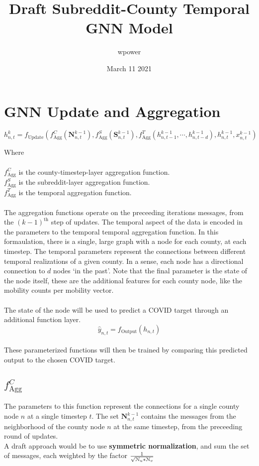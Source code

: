\documentclass{article}
\title{Draft Subreddit-County Temporal GNN Model}
\author{wpower}
\date{March 11 2021}
\begin{document}
\maketitle

\section{GNN Update and Aggregation}


\begin{equation}
h_{n,t}^k= f_{\text{Update}}(
						f_{\text{Agg}}^C(\textbf{N}_{n,t}^{k-1}),
						f_{\text{Agg}}^S(\textbf{S}_{n,t}^{k-1}),
						f_{\text{Agg}}^T(h_{n,t-1}^{k-1}, \cdots, h_{n, t-d}^{k-1}), 
						h_{n, t}^{k-1}, x_{n, t}^{k-1})
\end{equation}

Where \\
\\
$f_{\text{Agg}}^C$ is the county-timestep-layer aggregation function. \\
$f_{\text{Agg}}^S$ is the subreddit-layer aggregation function. \\
$f_{\text{Agg}}^T$ is the temporal aggregation function.  \\
\\
The aggregation functions operate on the preceeding iterations messages, from the $(k-1)^\text{th}$ step of updates. The temporal aspect of the data is encoded in the parameters to the temporal temporal aggregation function. In this formaulation, there is a single, large graph with a node for each county, at each timestep. The temporal parameters represent the connections between different temporal realizations of a given county. In a sense, each node has a directional connection to $d$ nodes `in the past'. Note that the final parameter is the state of the node itself, these are the additional features for each county node, like the mobility counts per mobility vector.\\
\\
The state of the node will be used to predict a COVID target through an additional function layer.
\\
$$\hat{y}_{n,t} = f_\text{Output}\left(h_{n,t}\right)$$
\\
These parameterized functions will then be trained by comparing this predicted output to the chosen COVID target. 
\subsection{$f_{\text{Agg}}^C$}
The parameters to this function represent the connections for a single county node $n$ at a single timestep $t$. The set $\textbf{N}_{n,t}^{k-1}$ contains the messages from the neighborhood of the county node $n$ at the same timestep, from the preceeding round of updates. 
\\
A draft approach would be to use \textbf{symmetric normalization}, and sum the set of messages, each weighted by the factor $\frac{1}{\sqrt{\EuScript{N}_u*\EuScript{N}_v}}$\\
\end{document}
